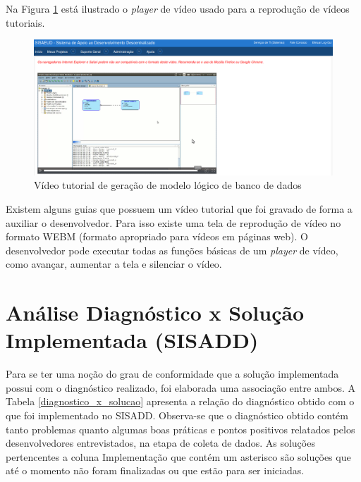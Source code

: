 Na Figura \ref{video_tutorial_sisadd} está ilustrado o \textit{player} de vídeo usado para a reprodução de vídeos tutoriais.

\begin{figure}[!htb]
	\hspace*{-1.5cm} 
		\includegraphics[scale=0.40]{figuras/video_p51}
	\caption{Vídeo tutorial de geração de modelo lógico de banco de dados}
	\label{video_tutorial_sisadd}
\end{figure}

Existem alguns guias que possuem um vídeo tutorial que foi gravado de forma a auxiliar o desenvolvedor. Para isso existe uma tela de reprodução de vídeo no formato WEBM (formato apropriado para vídeos em páginas web). O desenvolvedor pode executar todas as funções básicas de um \textit{player} de vídeo, como avançar, aumentar a tela e silenciar o vídeo.

\section{Análise Diagnóstico x Solução Implementada (SISADD)}

Para se ter uma noção do grau de conformidade que a solução implementada possui com o diagnóstico realizado, foi elaborada uma associação entre ambos. A Tabela \ref{diagnostico_x_solucao} apresenta a relação do diagnóstico obtido com o que foi implementado no SISADD. Observa-se que o diagnóstico obtido contém tanto problemas quanto algumas boas práticas e pontos positivos relatados pelos desenvolvedores entrevistados, na etapa de coleta de dados. As soluções pertencentes a coluna Implementação que contém um asterisco são soluções que até o momento não foram finalizadas ou que estão para ser iniciadas.

